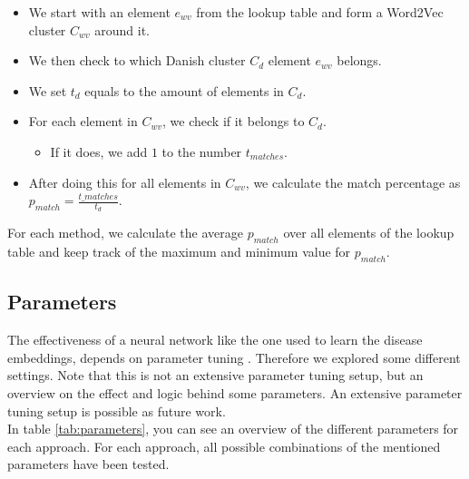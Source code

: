 \begin{itemize}

\item We start with an element $e_{wv}$ from the lookup table and form a Word2Vec cluster $C_{wv}$ around it.
\item We then check to which Danish cluster $C_d$ element $e_{wv}$ belongs.
\item We set $t_{d}$ equals to the amount of elements in $C_d$.
\item For each element in $C_{wv}$, we check if it belongs to $C_d$.
\begin{itemize}
\item If it does, we add $1$ to the number $t_{matches}$.
\end{itemize}
\item After doing this for all elements in $C_{wv}$, we calculate the match percentage as $p_{match} = \frac{t\_{matches}}{t_{d}}$.

\end{itemize}

For each method, we calculate the average $p_{match}$ over all elements of the lookup table and keep track of the maximum and minimum value for $p_{match}$.


\subsection{Parameters}
\label{sec:parameters}

The effectiveness of a neural network like the one used to learn the disease embeddings, depends on parameter tuning \cite{tuning:article}. Therefore we explored some different settings. Note that this is not an extensive parameter tuning setup, but an overview on the effect and logic behind some parameters. An extensive parameter tuning setup is possible as future work. \\

In table \ref{tab:parameters}, you can see an overview of the different parameters for each approach. For each approach, all possible combinations of the mentioned parameters have been tested. \\


